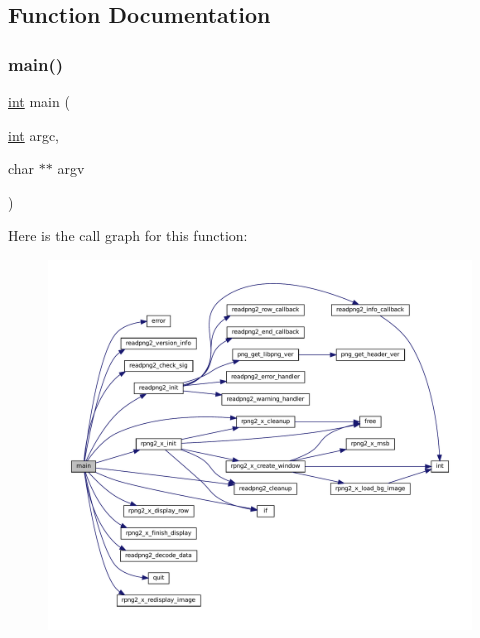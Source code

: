 \subsection{Function Documentation}
\mbox{\label{rpng2-x_8c_a3c04138a5bfe5d72780bb7e82a18e627}} 
\subsubsection{\texorpdfstring{main()}{main()}}
{\footnotesize\ttfamily \mbox{\hyperlink{ioapi_8h_a787fa3cf048117ba7123753c1e74fcd6}{int}} main (\begin{DoxyParamCaption}\item[{\mbox{\hyperlink{ioapi_8h_a787fa3cf048117ba7123753c1e74fcd6}{int}}}]{argc,  }\item[{char $\ast$$\ast$}]{argv }\end{DoxyParamCaption})}

Here is the call graph for this function\+:
\nopagebreak
\begin{figure}[H]
\begin{center}
\leavevmode
\includegraphics[width=350pt]{rpng2-x_8c_a3c04138a5bfe5d72780bb7e82a18e627_cgraph}
\end{center}
\end{figure}
\mbox{\label{rpng2-x_8c_aca1959fe9e81b967dfd94fa218c72e84}} 
